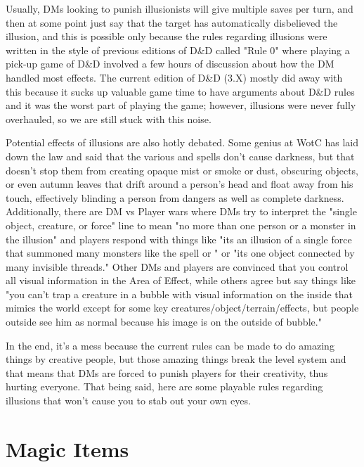 Usually, DMs looking to punish illusionists will give multiple saves per turn, and then at some point just say that the target has automatically disbelieved the illusion, and this is possible only because the rules regarding illusions were written in the style of previous editions of D\&D called "Rule 0" where playing a pick-up game of D\&D involved a few hours of discussion about how the DM handled most effects. The current edition of D\&D (3.X) mostly did away with this because it sucks up valuable game time to have arguments about D\&D rules and it was the worst part of playing the game; however, illusions were never fully overhauled, so we are still stuck with this noise.

Potential effects of illusions are also hotly debated. Some genius at WotC has laid down the law and said that the various  and  spells don't cause darkness, but that doesn't stop them from creating opaque mist or smoke or dust, obscuring objects, or even autumn leaves that drift around a person's head and float away from his touch, effectively blinding a person from dangers as well as complete darkness. Additionally, there are DM vs Player wars where DMs try to interpret the "single object, creature, or force" line to mean "no more than one person or a monster in the illusion" and players respond with things like "its an illusion of a single force that summoned many monsters like the spell  or " or "its one object connected by many invisible threads." Other DMs and players are convinced that you control all visual information in the Area of Effect, while others agree but say things like "you can't trap a creature in a bubble with visual information on the inside that mimics the world except for some key creatures/object/terrain/effects, but people outside see him as normal because his image is on the outside of bubble."

In the end, it's a mess because the current rules can be made to do amazing things by creative people, but those amazing things break the level system and that means that DMs are forced to punish players for their creativity, thus hurting everyone. That being said, here are some playable rules regarding illusions that won't cause you to stab out your own eyes.

\section{Magic Items}
\vspace*{-8pt}

